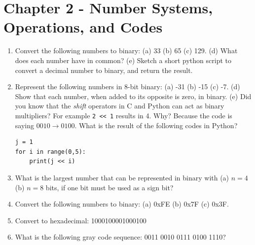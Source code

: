 \documentclass[10pt]{article}
\begin{document}
\section{Chapter 2 - Number Systems, Operations, and Codes}

\begin{enumerate}
\item Convert the following numbers to binary: (a) 33 (b) 65 (c) 129. (d) What does each number have in common? (e) Sketch a short python script to convert a decimal number to binary, and return the result. \\ \vspace{3cm}
\item Represent the following numbers in 8-bit binary: (a) -31 (b) -15 (c) -7.  (d) Show that each number, when added to its opposite is zero, in binary.  (e) Did you know that the \textit{shift} operators in C and Python can act as binary multipliers?  For example \verb+2 << 1+ results in 4.  Why? Because the code is saying $0010 \rightarrow 0100$. What is the result of the following codes in Python? 
\begin{verbatim}
j = 1
for i in range(0,5):
	print(j << i)	
\end{verbatim}
\vspace{3cm}
\item What is the largest number that can be represented in binary with (a) $n = 4$ (b) $n = 8$ bits, if one bit must be used as a sign bit? \\ \vspace{2cm}
\item Convert the following numbers to binary: (a) 0xFE (b) 0x7F (c) 0x3F. \\ \vspace{2cm}
\item Convert to hexadecimal: 1000100001000100 \\ \vspace{2cm}
\item What is the following gray code sequence: 0011 0010 0111 0100 1110? \\ \vspace{2cm}
\end{enumerate}

\clearpage
\end{document}
